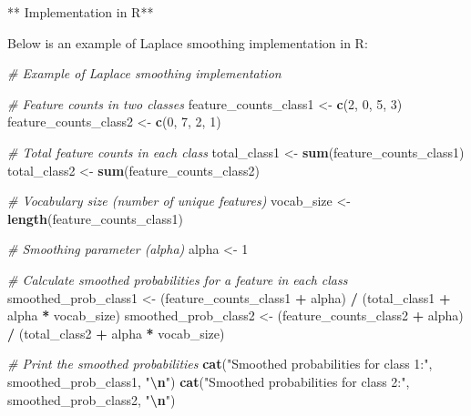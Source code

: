 \documentclass[
  12 pt,
  a4paper,
]{book}
\newenvironment{Shaded}{\begin{snugshade}}{\end{snugshade}}
\newcommand{\CommentTok}[1]{\textcolor[rgb]{0.56,0.35,0.01}{\textit{#1}}}
\newcommand{\DecValTok}[1]{\textcolor[rgb]{0.00,0.00,0.81}{#1}}
\newcommand{\FunctionTok}[1]{\textcolor[rgb]{0.13,0.29,0.53}{\textbf{#1}}}
\newcommand{\NormalTok}[1]{#1}
\newcommand{\OtherTok}[1]{\textcolor[rgb]{0.56,0.35,0.01}{#1}}
\newcommand{\SpecialCharTok}[1]{\textcolor[rgb]{0.81,0.36,0.00}{\textbf{#1}}}
\newcommand{\StringTok}[1]{\textcolor[rgb]{0.31,0.60,0.02}{#1}}
\numberwithin{equation}{section}
\theoremstyle{plain}      %
\theoremstyle{definition} %
\theoremstyle{remark}     %
\theoremstyle{note}         %
\begin{document}
** Implementation in R**

Below is an example of Laplace smoothing implementation in R:

\begin{Shaded}
\begin{Highlighting}[]
\CommentTok{\# Example of Laplace smoothing implementation}

\CommentTok{\# Feature counts in two classes}
\NormalTok{feature\_counts\_class1 }\OtherTok{\textless{}{-}} \FunctionTok{c}\NormalTok{(}\DecValTok{2}\NormalTok{, }\DecValTok{0}\NormalTok{, }\DecValTok{5}\NormalTok{, }\DecValTok{3}\NormalTok{)}
\NormalTok{feature\_counts\_class2 }\OtherTok{\textless{}{-}} \FunctionTok{c}\NormalTok{(}\DecValTok{0}\NormalTok{, }\DecValTok{7}\NormalTok{, }\DecValTok{2}\NormalTok{, }\DecValTok{1}\NormalTok{)}

\CommentTok{\# Total feature counts in each class}
\NormalTok{total\_class1 }\OtherTok{\textless{}{-}} \FunctionTok{sum}\NormalTok{(feature\_counts\_class1)}
\NormalTok{total\_class2 }\OtherTok{\textless{}{-}} \FunctionTok{sum}\NormalTok{(feature\_counts\_class2)}

\CommentTok{\# Vocabulary size (number of unique features)}
\NormalTok{vocab\_size }\OtherTok{\textless{}{-}} \FunctionTok{length}\NormalTok{(feature\_counts\_class1)}

\CommentTok{\# Smoothing parameter (alpha)}
\NormalTok{alpha }\OtherTok{\textless{}{-}} \DecValTok{1}

\CommentTok{\# Calculate smoothed probabilities for a feature in each class}
\NormalTok{smoothed\_prob\_class1 }\OtherTok{\textless{}{-}}\NormalTok{ (feature\_counts\_class1 }\SpecialCharTok{+}\NormalTok{ alpha) }\SpecialCharTok{/}\NormalTok{ (total\_class1 }\SpecialCharTok{+}\NormalTok{ alpha }\SpecialCharTok{*}\NormalTok{ vocab\_size)}
\NormalTok{smoothed\_prob\_class2 }\OtherTok{\textless{}{-}}\NormalTok{ (feature\_counts\_class2 }\SpecialCharTok{+}\NormalTok{ alpha) }\SpecialCharTok{/}\NormalTok{ (total\_class2 }\SpecialCharTok{+}\NormalTok{ alpha }\SpecialCharTok{*}\NormalTok{ vocab\_size)}

\CommentTok{\# Print the smoothed probabilities}
\FunctionTok{cat}\NormalTok{(}\StringTok{"Smoothed probabilities for class 1:"}\NormalTok{, smoothed\_prob\_class1, }\StringTok{"}\SpecialCharTok{\textbackslash{}n}\StringTok{"}\NormalTok{)}
\FunctionTok{cat}\NormalTok{(}\StringTok{"Smoothed probabilities for class 2:"}\NormalTok{, smoothed\_prob\_class2, }\StringTok{"}\SpecialCharTok{\textbackslash{}n}\StringTok{"}\NormalTok{)}
\end{Highlighting}
\end{Shaded}
\end{document}
